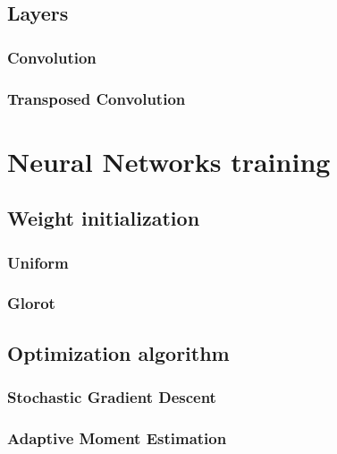 \subsection{Layers}
\subsubsection{Convolution}
\subsubsection{Transposed Convolution}
\lipsum[1-1]

\section{Neural Networks training}
\lipsum[1-1]
\subsection{Weight initialization}
\subsubsection{Uniform}
\subsubsection{Glorot} 
\subsection{Optimization algorithm}
\subsubsection{Stochastic Gradient Descent}
\subsubsection{Adaptive Moment Estimation}